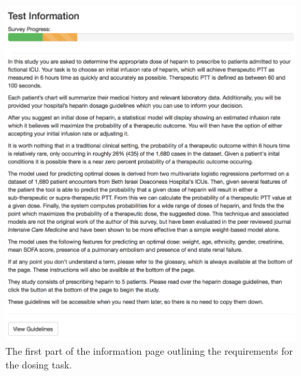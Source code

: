 \documentclass[12pt,a4paper,]{report}
\begin{document}
\begin{figure}[H]
\noindent
\includegraphics[width=1\textwidth]{source/figures/part3info_i.png}
\caption{\label{fig:part3info1}The first part of the information page outlining the requirements for the dosing task.}
\end{figure}
\end{document}
